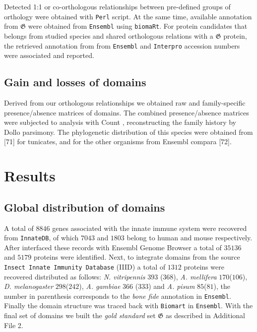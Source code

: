 \documentclass[11pt]{article}
\newcommand{\TODO}[1]{\begingroup\color{red}#1\endgroup}
\begin{document}
Detected 1:1 or co-orthologous relationships between pre-defined groups of 
orthology were obtained with \texttt{Perl} script. At the same time, available 
annotation from $\boldsymbol{\mathfrak{G}}$ were obtained from \texttt{Ensembl} 
using \texttt{biomaRt}. For protein candidates that belongs from studied 
species and shared orthologous relations with a $\boldsymbol{\mathfrak{G}}$ 
protein, the retrieved annotation from from \texttt{Ensembl} and 
\texttt{Interpro} accession numbers were associated and reported.

\subsection*{Gain and losses of domains}

Derived from our orthologous relationships we obtained raw and family-specific 
presence/absence matrices of domains. The combined presence/absence matrices 
were subjected to analysis with Count \cite{csuros2010}, reconstructing the 
family history by Dollo parsimony. The phylogenetic distribution of this species 
were obtained from \TODO{[71]} for tunicates, and for the other organisms from 
Ensembl compara \TODO{[72]}.

\section*{Results}

\subsection*{Global distribution of domains}

A total of $8846$ genes associated with the innate immune system were recovered 
from \texttt{InnateDB}, of which $7043$ and $1803$ belong to human and mouse 
respectively. After interfaced these records with Ensembl Genome Browser a total 
of $35136$ and $5179$ proteins were identified. Next, to integrate domains 
from the source \texttt{Insect Innate Immunity Database} (IIID) a total of 
$1312$ proteins were recovered distributed as follows: \textsl{N. vitripennis} 
$393$ ($368$), \textsl{A. mellifera} $170$($106$), \textsl{D. melanogaster} 
$298$($242$), \textsl{A. gambiae} $366$ ($333$) and \textsl{A. pisum} 
$85$($81$), the number in parenthesis corresponds to the \textsl{bone fide} 
annotation in \texttt{Ensembl}. Finally the domain structure was traced back 
with \texttt{Biomart} in \texttt{Ensembl}. With the final set of domains we 
built the \textsl{gold standard} set $\boldsymbol{\mathfrak{G}}$ as described 
in Additional File 2. 
\end{document}
